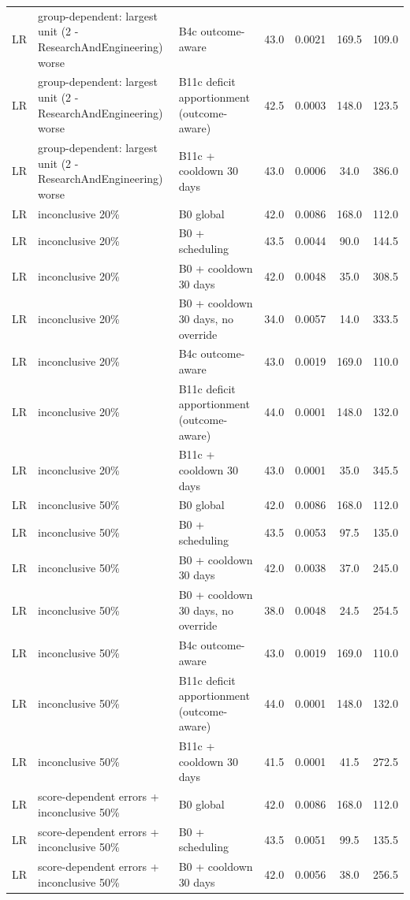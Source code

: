 \begin{longtable}{lp{5.2cm}p{4.4cm}cccc}
LR & group-dependent: largest unit (2 - ResearchAndEngineering) worse & B4c outcome-aware & 43.0 & 0.0021 & 169.5 & 109.0 \\
LR & group-dependent: largest unit (2 - ResearchAndEngineering) worse & B11c deficit apportionment (outcome-aware) & 42.5 & 0.0003 & 148.0 & 123.5 \\
LR & group-dependent: largest unit (2 - ResearchAndEngineering) worse & B11c + cooldown 30 days & 43.0 & 0.0006 & 34.0 & 386.0 \\
LR & inconclusive 20\% & B0 global & 42.0 & 0.0086 & 168.0 & 112.0 \\
LR & inconclusive 20\% & B0 + scheduling & 43.5 & 0.0044 & 90.0 & 144.5 \\
LR & inconclusive 20\% & B0 + cooldown 30 days & 42.0 & 0.0048 & 35.0 & 308.5 \\
LR & inconclusive 20\% & B0 + cooldown 30 days, no override & 34.0 & 0.0057 & 14.0 & 333.5 \\
LR & inconclusive 20\% & B4c outcome-aware & 43.0 & 0.0019 & 169.0 & 110.0 \\
LR & inconclusive 20\% & B11c deficit apportionment (outcome-aware) & 44.0 & 0.0001 & 148.0 & 132.0 \\
LR & inconclusive 20\% & B11c + cooldown 30 days & 43.0 & 0.0001 & 35.0 & 345.5 \\
LR & inconclusive 50\% & B0 global & 42.0 & 0.0086 & 168.0 & 112.0 \\
LR & inconclusive 50\% & B0 + scheduling & 43.5 & 0.0053 & 97.5 & 135.0 \\
LR & inconclusive 50\% & B0 + cooldown 30 days & 42.0 & 0.0038 & 37.0 & 245.0 \\
LR & inconclusive 50\% & B0 + cooldown 30 days, no override & 38.0 & 0.0048 & 24.5 & 254.5 \\
LR & inconclusive 50\% & B4c outcome-aware & 43.0 & 0.0019 & 169.0 & 110.0 \\
LR & inconclusive 50\% & B11c deficit apportionment (outcome-aware) & 44.0 & 0.0001 & 148.0 & 132.0 \\
LR & inconclusive 50\% & B11c + cooldown 30 days & 41.5 & 0.0001 & 41.5 & 272.5 \\
LR & score-dependent errors + inconclusive 50\% & B0 global & 42.0 & 0.0086 & 168.0 & 112.0 \\
LR & score-dependent errors + inconclusive 50\% & B0 + scheduling & 43.5 & 0.0051 & 99.5 & 135.5 \\
LR & score-dependent errors + inconclusive 50\% & B0 + cooldown 30 days & 42.0 & 0.0056 & 38.0 & 256.5 \\

\end{longtable}

